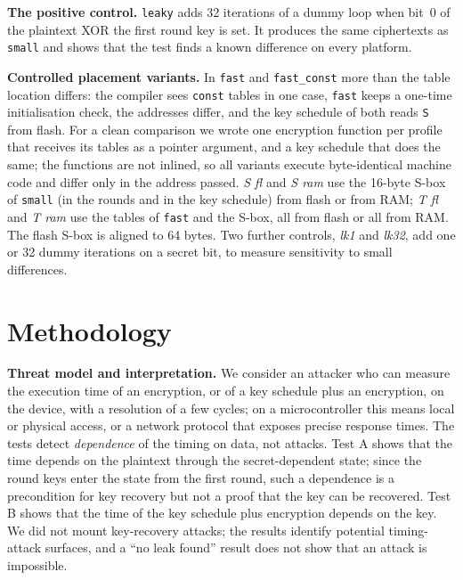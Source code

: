 \documentclass[11pt, a4paper, twoside, reqno]{article}
\newcommand{\tsm}{\texttt{small}}
\newcommand{\tfa}{\texttt{fast}}
\newcommand{\tfc}{\texttt{fast\_const}}
\newcommand{\tlk}{\texttt{leaky}}
\begin{document}
\textbf{The positive control.} \tlk{} adds 32 iterations of a dummy loop when bit~0 of the plaintext XOR the first round key is set. It produces the same ciphertexts as \tsm{} and shows that the test finds a known difference on every platform.

\textbf{Controlled placement variants.} In \tfa{} and \tfc{} more than the table location differs: the compiler sees \texttt{const} tables in one case, \tfa{} keeps a one-time initialisation check, the addresses differ, and the key schedule of both reads \texttt{S} from flash. For a clean comparison we wrote one encryption function per profile that receives its tables as a pointer argument, and a key schedule that does the same; the functions are not inlined, so all variants execute byte-identical machine code and differ only in the address passed. \emph{S fl} and \emph{S ram} use the 16-byte S-box of \tsm{} (in the rounds and in the key schedule) from flash or from RAM; \emph{T fl} and \emph{T ram} use the tables of \tfa{} and the S-box, all from flash or all from RAM. The flash S-box is aligned to 64 bytes. Two further controls, \emph{lk1} and \emph{lk32}, add one or 32 dummy iterations on a secret bit, to measure sensitivity to small differences.

\section{Methodology}

\textbf{Threat model and interpretation.} We consider an attacker who can measure the execution time of an encryption, or of a key schedule plus an encryption, on the device, with a resolution of a few cycles; on a microcontroller this means local or physical access, or a network protocol that exposes precise response times. The tests detect \emph{dependence} of the timing on data, not attacks. Test A shows that the time depends on the plaintext through the secret-dependent state; since the round keys enter the state from the first round, such a dependence is a precondition for key recovery but not a proof that the key can be recovered. Test B shows that the time of the key schedule plus encryption depends on the key. We did not mount key-recovery attacks; the results identify potential timing-attack surfaces, and a ``no leak found'' result does not show that an attack is impossible.
\end{document}
